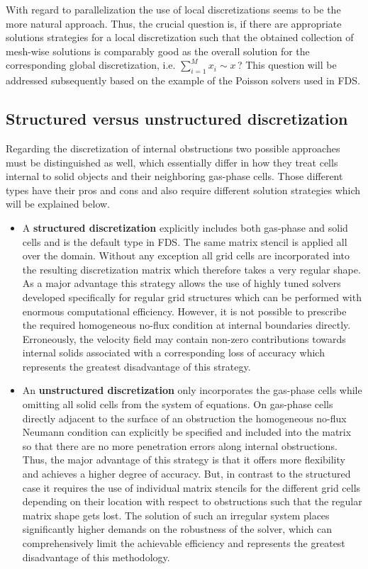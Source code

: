 With regard to parallelization the use of local discretizations seems to be the more natural approach. 
Thus, the crucial question is, if there are appropriate solutions strategies for a local discretization 
such that the obtained collection of mesh-wise solutions is comparably good as the overall solution for the corresponding global discretization, i.e. $\sum_{i=1}^M x_i \sim x$\,?
This question will be addressed subsequently based on the example of the Poisson solvers used in FDS.

\subsection{Structured versus unstructured discretization}
Regarding the discretization of internal obstructions two possible approaches must be distinguished as well, which essentially differ in how they treat cells internal to solid objects and their neighboring gas-phase cells. Those different types have their pros and cons and also require different solution strategies which will be explained below.
\newpage
\begin{itemize}
\item A {\bf structured discretization}
explicitly includes both gas-phase and solid cells and is the default type in FDS. The same matrix stencil is applied all over the domain. Without any exception all grid cells are incorporated into the resulting discretization matrix which therefore takes a very regular shape. As a major advantage this strategy allows the use of highly tuned solvers developed specifically for regular grid structures which can be performed with enormous computational efficiency. However, it is not possible to prescribe the required homogeneous no-flux condition at internal boundaries directly. Erroneously, the velocity field may contain non-zero contributions towards internal solids associated with a corresponding loss of accuracy which represents the greatest disadvantage of this strategy.
\item An {\bf unstructured discretization}
only incorporates the gas-phase cells while omitting all solid cells from the system of equations. On gas-phase cells directly adjacent to the surface of an obstruction the homogeneous no-flux Neumann condition can explicitly be specified and included into the matrix so that there are no more penetration errors along internal obstructions. Thus, the major advantage of this strategy is that it offers more flexibility and achieves a higher degree of accuracy. But, in contrast to the structured case it requires the use of individual matrix stencils for the different grid cells depending on their location with respect to obstructions such that the regular matrix shape gets lost. The solution of such an irregular system places significantly higher demands on the robustness of the solver, which can comprehensively limit the achievable efficiency and represents the greatest disadvantage of this methodology.
\end{itemize}
